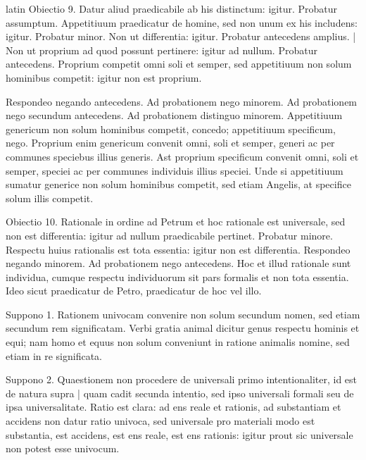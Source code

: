 \begin{otherlanguage*}{latin}
\pstart
  Obiectio 9. Datur aliud praedicabile ab his distinctum: igitur. Probatur assumptum. Appetitiuum praedicatur de homine, sed non unum ex his includens: igitur. Probatur minor. Non ut differentia: igitur. Probatur antecedens amplius. \textnormal{|}   Non ut proprium ad quod possunt pertinere: igitur ad nullum. Probatur antecedens. Proprium competit omni soli et semper, sed appetitiuum non solum hominibus competit: igitur non est proprium. 
\pend

\pstart
  Respondeo negando antecedens. Ad probationem nego minorem. Ad probationem nego secundum antecedens. Ad probationem distinguo minorem. Appetitiuum genericum non solum hominibus competit, concedo; appetitiuum specificum, nego. Proprium enim genericum convenit omni, soli et semper, generi ac per communes speciebus illius generis. Ast proprium specificum convenit omni, soli et semper, speciei ac per communes individuis illius speciei. Unde si appetitiuum sumatur generice non solum hominibus competit, sed etiam Angelis, at specifice solum illis competit. 
\pend

\pstart
  Obiectio 10. Rationale in ordine ad Petrum et hoc rationale est universale, sed non est differentia: igitur ad nullum praedicabile pertinet. Probatur minore. Respectu huius rationalis est tota essentia: igitur non est differentia. Respondeo negando minorem. Ad probationem nego antecedens. Hoc et illud rationale sunt individua, cumque respectu individuorum sit pars formalis et non tota essentia. Ideo sicut praedicatur de Petro, praedicatur de hoc vel illo. 
\pend

        \pstart
        \pend
      
\pstart
  Suppono 1. Rationem univocam convenire non solum secundum nomen, sed etiam secundum rem significatam. Verbi gratia animal dicitur genus respectu hominis et equi; nam homo et equus non solum conveniunt in ratione animalis nomine, sed etiam in re significata. 
\pend

\pstart
  Suppono 2. Quaestionem non procedere de universali primo intentionaliter, id est de natura supra \textnormal{|} quam cadit secunda intentio, sed ipso universali formali seu de ipsa universalitate. Ratio est clara: ad ens reale et rationis, ad substantiam et accidens non datur ratio univoca, sed universale pro materiali modo est substantia, est accidens, est ens reale, est ens rationis: igitur prout sic universale non potest esse univocum. 
\pend


\end{otherlanguage*}
